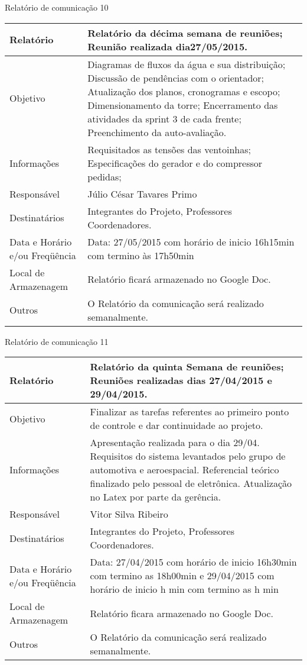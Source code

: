 \begin{center}
{\large Relatório de comunicação 10}
\begin{table}[h]
\begin{tabular}{|p{6cm}|p{9cm}|}\hline
Relatório&Relatório da décima semana de reuniões; Reunião realizada dia27/05/2015.\\ \hline
Objetivo&Diagramas de fluxos da água e sua distribuição;
Discussão de pendências com o orientador;
Atualização dos planos, cronogramas e escopo;
Dimensionamento da torre;
Encerramento das atividades da sprint 3 de cada frente;
Preenchimento da auto-avaliação.\\ \hline
Informações&Requisitados as tensões das ventoinhas;
Especificações do gerador e do compressor pedidas;\\ \hline
Responsável&Júlio César Tavares Primo\\ \hline
Destinatários&Integrantes do Projeto, Professores Coordenadores.\\ \hline
Data e Horário e/ou Freqüência&Data: 27/05/2015 com horário de inicio 16h15min com termino às 17h50min\\ \hline
Local de Armazenagem&Relatório ficará armazenado no Google Doc.\\ \hline
Outros&O Relatório da comunicação será realizado semanalmente.\\ \hline
\end{tabular}
\end{table}
\FloatBarrier

{\large Relatório de comunicação 11}
\begin{table}[h]
\begin{tabular}{|p{6cm}|p{9cm}|}\hline
Relatório&Relatório da quinta Semana de reuniões; Reuniões realizadas dias 27/04/2015 e 29/04/2015.\\ \hline
Objetivo&Finalizar as tarefas referentes ao primeiro ponto de controle e dar continuidade ao projeto.\\ \hline
Informações&	Apresentação realizada para o dia 29/04.
Requisitos do sistema levantados pelo grupo de automotiva e aeroespacial.
Referencial teórico finalizado pelo pessoal de eletrônica.
Atualização no Latex por parte da gerência.\\ \hline
Responsável&Vitor Silva Ribeiro\\ \hline
Destinatários&Integrantes do Projeto, Professores Coordenadores.\\ \hline
Data e Horário e/ou Freqüência	&Data: 27/04/2015 com horário de inicio 16h30min com termino as 18h00min e 29/04/2015 com horário de inicio h min com termino as h min\\ \hline
Local de Armazenagem&Relatório ficara armazenado no Google Doc.\\ \hline
Outros	& O Relatório da comunicação será realizado semanalmente.\\ \hline
\end{tabular}
\end{table}
\FloatBarrier


\end{center}
